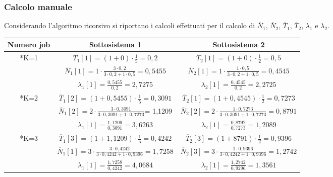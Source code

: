 \subsubsection{Calcolo manuale}
Considerando l'algoritmo ricorsivo si riportano i calcoli effettuati per il calcolo
di $\overline{N}_1$,  $\overline{N}_2$, $\overline{T}_1$,  $\overline{T}_2$,  $\lambda_1$ e $\lambda_2$.\\

\begin{tabular}{c|c|c}
\textbf{Numero job}&\textbf{Sottosistema 1}&\textbf{Sottosistema 2}\\
\hline
\hline
\rule[-4mm]{0mm}{1cm}
\multirow{3}*{K=1} &$ \overline{T}_1[1]=(1+0)\cdot \frac{1}{5}=0,2$ & $ \overline{T}_2[1]=(1+0)\cdot \frac{1}{2}=0,5$\\
\cline{2-3}
\rule[-4mm]{0mm}{1cm}
&$ \overline{N}_1[1]=1\cdot \frac{3\cdot 0,2}{3 \cdot 0,2 + 1 \cdot 0,5}=0,5455$ & $ \overline{N}_2[1]=1\cdot \frac{1 \cdot 0,5}{3 \cdot 0,2 + 1 \cdot 0,5}=0,4545$\\
\cline{2-3}
\rule[-4mm]{0mm}{1cm}
&$ \lambda_1[1]=\frac{0,5455}{0,2}=2,7275$ & $ \lambda_2[1]=\frac{0,4545}{0,2}=2,2725$\\
\hline
\hline
\rule[-4mm]{0mm}{1cm}
\multirow{3}*{K=2} &$ \overline{T}_1[2]=(1+0,5455)\cdot \frac{1}{5}=0,3091$ & $ \overline{T}_2[1]=(1+0,4545)\cdot \frac{1}{2}=0,7273$\\
\cline{2-3}
\rule[-4mm]{0mm}{1cm}
&$ \overline{N}_1[2]=2\cdot \frac{3\cdot 0,3091}{3 \cdot 0,3091 + 1 \cdot 0,7273}$= 1,1209 & $ \overline{N}_2[2]=2\cdot \frac{1\cdot 0,7273}{3 \cdot 0,3091 + 1 \cdot 0,7273}=0,8791$\\
\cline{2-3}
\rule[-4mm]{0mm}{1cm}
&$ \lambda_1[1]=\frac{1,1209}{0,3091}=3,6263$ & $ \lambda_2[1]=\frac{0,8792}{0,7273}=1,2089$\\
\hline
\hline
\rule[-4mm]{0mm}{1cm}
\multirow{3}*{K=3} &$ \overline{T}_1[3]=(1+1,1209)\cdot \frac{1}{5}=0,4242$ & $ \overline{T}_2[3]=(1+8791)\cdot \frac{1}{2}=0,9396$\\
\cline{2-3}
\rule[-4mm]{0mm}{1cm}
&$ \overline{N}_1[1]=3\cdot \frac{3\cdot 0,4242}{3 \cdot 0,4242 + 1 \cdot 0,9396}=1,7258$ & $ \overline{N}_2[3]=3\cdot \frac{1\cdot 0,9396}{3 \cdot 0,4242 + 1 \cdot 0,9396}=1,2742$\\
\cline{2-3}
\rule[-4mm]{0mm}{1cm}
&$ \lambda_1[1]=\frac{1,7258}{0,4242}=4,0684$ & $ \lambda_2[1]=\frac{1,2742}{0,9296}=1,3561$\\
\hline
\end{tabular}

